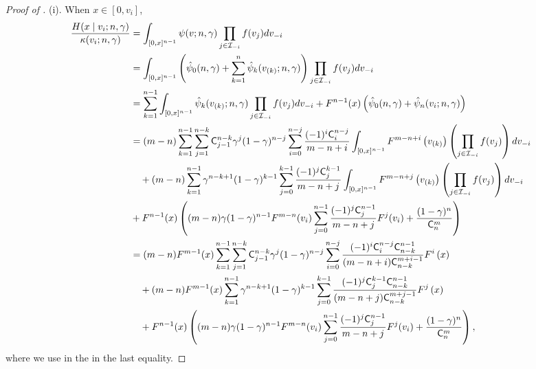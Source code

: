 \begin{proof}[Proof of ] (i). 
When $x \in [0,v_i]$,
\begin{align*}
\frac{H(x\mid v_i;n,\gamma)}{\kappa(v_i;n,\gamma)} &=   
 \int_{[0,x]^{n-1}}
\psi(v;n,\gamma)\prod_{j\in \mathcal{I}_{-i}} f(v_j) 
dv_{-i}\\
& = \int_{[0,x]^{n-1}}
\left(\hat{\psi}_0(n,\gamma)+\sum_{k=1}^n \hat{\psi}_k(v_{(k)};n,\gamma)\right)\prod_{j\in \mathcal{I}_{-i}} f(v_j)dv_{-i}\\
& = \sum_{k=1}^{n-1} \int_{[0,x]^{n-1}} \hat{\psi}_k(v_{(k)};n,\gamma) \prod_{j\in \mathcal{I}_{-i}} f(v_j)
dv_{-i} + F^{n-1}(x)\left(\hat{\psi}_0(n,\gamma)+\hat{\psi}_n(v_{i};n,\gamma)\right)\\
& = (m-n)\sum_{k=1}^{n-1}  \sum_{j=1}^{n-k}\mathsf{C}^{n-k}_{j-1}\gamma^j
 (1-\gamma)^{n-j}\sum_{i=0}^{n-j}\frac{(-1)^{i}\mathsf{C}^{n-j}_i}{m-n+i}\int_{[0,x]^{n-1}}F^{m-n+i}\left(v_{(k)}\right)\left(\prod_{j\in \mathcal{I}_{-i}} f(v_j)\right)dv_{-i}\\
 & \quad + (m-n)\sum_{k=1}^{n-1} \gamma^{n-k+1}
 (1-\gamma)^{k-1}\sum_{j=0}^{k-1}\frac{(-1)^{j}\mathsf{C}^{k-1}_j}{m-n+j}\int_{[0,x]^{n-1}}F^{m-n+j}\left(v_{(k)}\right)\left(\prod_{j\in \mathcal{I}_{-i}} f(v_j)\right) dv_{-i}\\
 & + F^{n-1}(x)\left((m-n)\gamma(1-\gamma)^{n-1}F^{m-n}(v_i)\sum_{j=0}^{n-1}\frac{(-1)^j\mathsf{C}^{n-1}_j}{m-n+j}F^j(v_i) + \frac{(1-\gamma)^n}{\mathsf{C}^m_n}\right)\\
& = (m-n)F^{m-1}(x)\sum_{k=1}^{n-1}  \sum_{j=1}^{n-k}\mathsf{C}^{n-k}_{j-1}\gamma^j
 (1-\gamma)^{n-j}\sum_{i=0}^{n-j}\frac{(-1)^{i}\mathsf{C}^{n-j}_i\mathsf{C}^{n-1}_{n-k}}{(m-n+i)\mathsf{C}^{m+i-1}_{n-k}}F^i\left(x\right)\\
 & \quad + (m-n)F^{m-1}(x)\sum_{k=1}^{n-1} \gamma^{n-k+1}
 (1-\gamma)^{k-1}\sum_{j=0}^{k-1}\frac{(-1)^{j}\mathsf{C}^{k-1}_j\mathsf{C}^{n-1}_{n-k}}{(m-n+j)\mathsf{C}^{m+j-1}_{n-k}}F^{j}\left(x\right) \\
 &\quad + F^{n-1}(x)\left((m-n)\gamma(1-\gamma)^{n-1}F^{m-n}(v_i)\sum_{j=0}^{n-1}\frac{(-1)^j\mathsf{C}^{n-1}_j}{m-n+j}F^j(v_i) + \frac{(1-\gamma)^n}{\mathsf{C}^m_n}\right),
\end{align*}
where we use  in the in the last equality.

\medskip


\end{proof}
